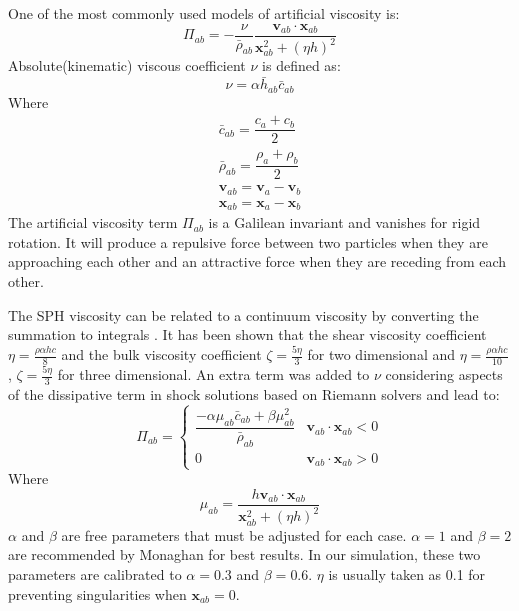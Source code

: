 \documentclass[journal abbreviation, manuscript]{copernicus}
\begin{document}
One of the most commonly used models of artificial viscosity is:
\begin{equation}
\Pi_{ab}=- \frac{\nu}{\bar{\rho}_{ab}} \dfrac{ \textbf{v}_{ab} \cdot \textbf{x}_{ab}}{\textbf{x}_{ab}^2 + (\eta h)^2}
\label{eq:art-vis-original}
\end{equation}
Absolute(kinematic) viscous coefficient $\nu$ is defined as:
\begin{equation}
\nu = \alpha \bar{h}_{ab} \bar{c}_{ab}
\end{equation}
Where 
\begin{align}
\bar{c}_{ab} = \dfrac{c_a + c_b}{2} \\
\bar{\rho}_{ab} = \dfrac{\rho_a + \rho_b}{2} \\
\textbf{v}_{ab}=\textbf{v}_a-\textbf{v}_b \\
\textbf{x}_{ab}=\textbf{x}_a-\textbf{x}_b
\end{align}
The artificial viscosity term $\Pi_{ab}$ is a Galilean invariant and vanishes for rigid rotation. It will produce a repulsive force between two particles when they are approaching each other and an attractive force when they are receding from each other. 

The SPH viscosity can be related to a continuum viscosity by converting the summation to integrals \citep{monaghan2005smoothed}. It has been shown that the shear viscosity coefficient $\eta = \frac{\rho \alpha h c}{8} $ and the bulk viscosity coefficient $ \zeta = \frac{5 \eta}{3}$ for two dimensional and $\eta = \frac{\rho \alpha h c}{10} $ , $ \zeta = \frac{5 \eta}{3}$ for three dimensional.
An extra term was added to $\nu$ considering aspects of the dissipative term in shock solutions based on Riemann solvers and lead to:
\begin{equation}
\Pi_{ab} = 
\begin{cases} 
      \dfrac{- \alpha \mu_{ab} \bar{c}_{ab} + \beta \mu_{ab}^2} {\bar{\rho}_{ab}} & \textbf{v}_{ab} \cdot \textbf{x}_{ab} < 0\\
      0 & \textbf{v}_{ab} \cdot \textbf{x}_{ab} > 0
\end{cases}
\label{eq:art-vis-shock}
\end{equation}
Where
\begin{equation}
\mu_{ab} = \dfrac{h \textbf{v}_{ab} \cdot \textbf{x}_{ab}}{\textbf{x}_{ab}^2 + (\eta h)^2} 
\end{equation}
$\alpha$ and $\beta$ are free parameters that must be adjusted for each case. $\alpha = 1$ and $\beta = 2$ are  recommended by Monaghan for best results. In our simulation, these two parameters are calibrated to  $\alpha = 0.3$ and $\beta = 0.6$. $\eta$ is usually taken as 0.1 for preventing singularities when $\textbf{x}_{ab} = 0$.
\end{document}

